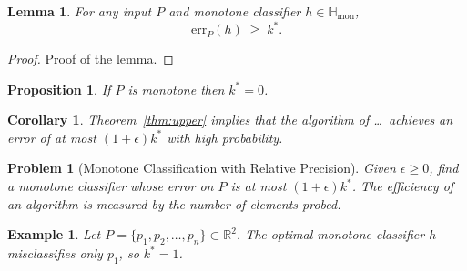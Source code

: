 \documentclass[11pt, a4paper]{article}
\theoremstyle{boxed}
\newtheorem{innerlemma}{Lemma}[section]
\newtheorem{innerproposition}{Proposition}[section]
\newtheorem{innercorollary}{Corollary}[section]
\newtheorem{innerproblem}{Problem}[section]
\newtheorem{innerexample}{Example}[section]
\newenvironment{lemma}
  {\begin{mdframed}[style=lemstyle]\begin{innerlemma}}
  {\end{innerlemma}\end{mdframed}}
\newenvironment{proposition}
  {\begin{mdframed}[style=propstyle]\begin{innerproposition}}
  {\end{innerproposition}\end{mdframed}}
\newenvironment{corollary}
  {\begin{mdframed}[style=thmstyle]\begin{innercorollary}}
  {\end{innercorollary}\end{mdframed}}
\newenvironment{problem}
  {\begin{mdframed}[style=defstyle]\begin{innerproblem}}
  {\end{innerproblem}\end{mdframed}}
\newenvironment{example}
  {\begin{mdframed}[style=notestyle]\begin{innerexample}}
  {\end{innerexample}\end{mdframed}}
\newcommand{\R}{\mathbb{R}}
\newcommand{\Hmon}{\mathbb{H}_{\mathrm{mon}}}
\newcommand{\err}{\mathrm{err}}
\newcommand{\kstar}{k^{*}}
\begin{document}
\begin{lemma}\label{lem:key}
  For any input $P$ and monotone classifier $h \in \Hmon$,
  \[
    \err_P(h) \;\ge\; \kstar.
  \]
\end{lemma}

\begin{proof}
  Proof of the lemma.
\end{proof}

\begin{proposition}\label{prop:one}
  If $P$ is monotone then $\kstar = 0$.
\end{proposition}

\begin{corollary}\label{cor:one}
  Theorem~\ref{thm:upper} implies that the algorithm of \ldots\ achieves
  an error of at most $(1+\epsilon)\kstar$ with high probability.
\end{corollary}

\begin{problem}[Monotone Classification with Relative Precision]\label{prob:main}
  Given $\epsilon \ge 0$, find a monotone classifier whose error on $P$
  is at most $(1+\epsilon)\kstar$.
  The efficiency of an algorithm is measured by the number of elements probed.
\end{problem}

\begin{example}
  Let $P = \{p_1, p_2, \ldots, p_n\} \subset \R^2$.
  The optimal monotone classifier $h$ misclassifies only $p_1$, so $\kstar = 1$.
\end{example}
\end{document}
